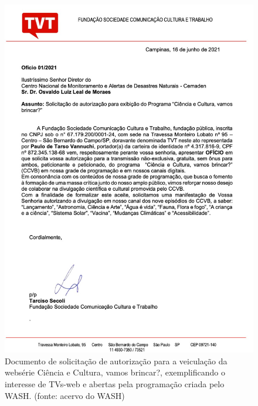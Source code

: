 \documentclass[
12pt,		%
openright,	%
twoside,  %
a4paper,			%
chapter=TITLE,		%
english,			%
french,				%
spanish,			%
brazil				%
]{USPSC-classe/USPSC}
\begin{document}
\captionsetup{format=plain}
\begin{figure}[max size={\textwidth}{\textheight}]

\centering


\begin{minipage}[b]{0.4\linewidth}
        \centering
                \includegraphics[width=1.0\linewidth]{../../imagens/TVT.jpg}
                \caption{Documento de solicita\c{c}\~ao de autoriza\c{c}\~ao para a veicula\c{c}\~ao da webs\'erie Ci\^encia e Cultura, vamos brincar?, exemplificando o interesse de TVs-web e abertas pela programa\c{c}\~ao criada pelo WASH. (fonte: acervo do WASH)}
                \label{51f9418c1ca6e2404e9d774513fb6c023d10b3bb}
\end{minipage}%
\hspace{0.5cm}
\end{figure}
\end{document}
